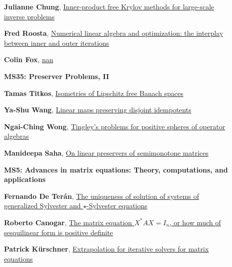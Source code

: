 \documentclass[ILAS2025-program.tex]{subfiles}
\begin{document}
\begin{description}
\begin{description}
        \item[] \hypertarget{up0312}{}\textbf{Julianne Chung}, \hyperlink{down0312}{Inner-product free Krylov methods for large-scale inverse problems}
        \item[] \hypertarget{up0313}{}\textbf{Fred Roosta}, \hyperlink{down0313}{Numerical linear algebra and optimization: the interplay between inner and outer iterations
}
        \item[] \hypertarget{up0314}{}\textbf{Colin Fox}, \hyperlink{down0314}{nan}
        \end{description}
    \begin{description}
    \item[] {\color{mstitle}\textbf{MS35: Preserver Problems, II}} 
    \item[] \hypertarget{up0315}{}\textbf{Tamas Titkos}, \hyperlink{down0315}{Isometries of Lipschitz free Banach spaces}
        \item[] \hypertarget{up0316}{}\textbf{Ya-Shu Wang}, \hyperlink{down0316}{Linear maps preserving disjoint idempotents
}
        \item[] \hypertarget{up0317}{}\textbf{Ngai-Ching Wong}, \hyperlink{down0317}{Tingley's problems for positive spheres of operator algebras}
        \item[] \hypertarget{up0318}{}\textbf{Manideepa Saha}, \hyperlink{down0318}{On linear preservers of semimonotone matrices}
        \end{description}
    \begin{description}
    \item[] {\color{mstitle}\textbf{MS5: Advances in matrix equations: Theory, computations, and applications}} 
    \item[] \hypertarget{up0319}{}\textbf{Fernando De Terán}, \hyperlink{down0319}{The uniqueness of solution of systems of generalized Sylvester and $\star$-Sylvester equations}
        \item[] \hypertarget{up0320}{}\textbf{Roberto Canogar}, \hyperlink{down0320}{The matrix equation $X^*AX=I_n$, or how much of sesquilinear form is positive definite
}
        \item[] \hypertarget{up0321}{}\textbf{Patrick Kürschner}, \hyperlink{down0321}{Extrapolation for iterative solvers for matrix equations
}
\end{description}
\end{description}
\end{document}
